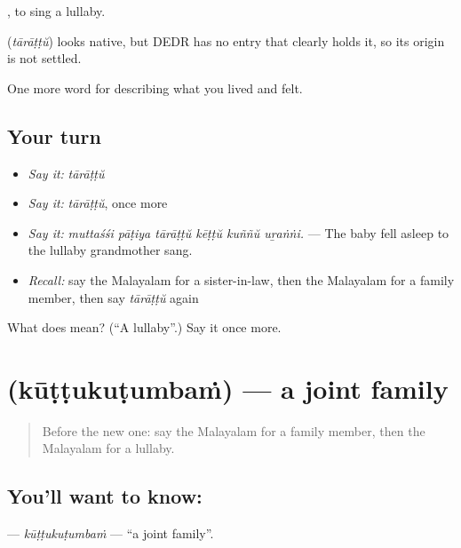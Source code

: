  , to sing a lullaby.

\begin{cousinweb}
\textbf{} (\emph{tārāṭṭŭ}) looks native, but DEDR has no entry that clearly holds it, so its origin is not settled.
\end{cousinweb}

\begin{grammarlens}[title={What you've built}]
One more word for describing what you lived and felt.
\end{grammarlens}

\subsection*{Your turn}
\begin{itemize}
\raggedright
  \item \emph{Say it:} \emph{tārāṭṭŭ}
  \item \emph{Say it:} \emph{tārāṭṭŭ}, once more
  \item \emph{Say it:} \emph{muttaśśi pāṭiya tārāṭṭŭ kēṭṭŭ kuññŭ uṟaṅṅi.} — The baby fell asleep to the lullaby grandmother sang.
  \item \emph{Recall:} say the Malayalam for a sister-in-law, then the Malayalam for a family member, then say \emph{tārāṭṭŭ} again
\end{itemize}

\begin{tcolorbox}[breakable,colback=teal!4,colframe=teal!35!black,title={Before you move on}]
What does  mean? (\textquotedblleft{}A lullaby\textquotedblright{}.) Say it once more.
\end{tcolorbox}
\section[\texorpdfstring{\ml{കൂട്ടുകുടുംബം} (kūṭṭukuṭumbaṁ)}{കൂട്ടുകുടുംബം (kūṭṭukuṭumbaṁ)}]{ (kūṭṭukuṭumbaṁ) — a joint family}

\label{lesson:ML-C555-kuttukutumbam}



\begin{quote}
Before the new one: say the Malayalam for a family member, then the Malayalam for a lullaby.
\end{quote}

\subsection*{You'll want to know: }
\textbf{} — \emph{kūṭṭukuṭumbaṁ} — \textquotedblleft{}a joint family\textquotedblright{}.

